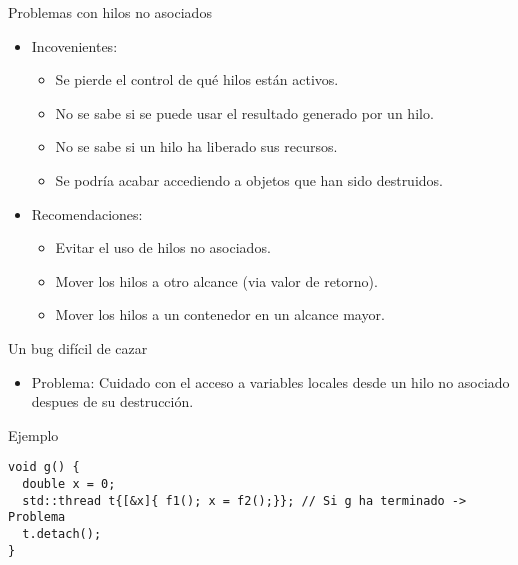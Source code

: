 \begin{frame}[fragile]{Problemas con hilos no asociados}
\begin{itemize}
  \item Incovenientes:
    \begin{itemize}
      \item Se pierde el control de qué hilos están activos.
      \item No se sabe si se puede usar el resultado generado por un hilo.
      \item No se sabe si un hilo ha liberado sus recursos.
      \item Se podría acabar accediendo a objetos que han sido destruidos.
    \end{itemize}
  \vfill
  \item Recomendaciones:
    \begin{itemize}
      \item Evitar el uso de hilos no asociados.
      \item Mover los hilos a otro alcance (via valor de retorno).
      \item Mover los hilos a un contenedor en un alcance mayor.
    \end{itemize}
\end{itemize}
\end{frame}

\begin{frame}[fragile]{Un bug difícil de cazar}
\begin{itemize}
  \item \alert{Problema}: Cuidado con el acceso a variables locales desde un hilo no asociado despues de su destrucción.
\end{itemize}
\begin{block}{Ejemplo}
\begin{lstlisting}
void g() {
  double x = 0;
  std::thread t{[&x]{ f1(); x = f2();}}; // Si g ha terminado -> Problema
  t.detach();
}
\end{lstlisting}
\end{block}
\end{frame}

